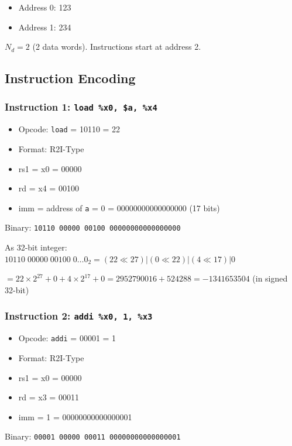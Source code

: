 \documentclass[12pt,a4paper]{article}
\begin{document}
\begin{itemize}
    \item Address 0: 123
    \item Address 1: 234
\end{itemize}

$N_d = 2$ (2 data words). Instructions start at address 2.

\subsection{Instruction Encoding}

\subsubsection{Instruction 1: \texttt{load \%x0, \$a, \%x4}}

\begin{itemize}
    \item Opcode: \texttt{load} = 10110 = 22
    \item Format: R2I-Type
    \item rs1 = x0 = 00000
    \item rd = x4 = 00100
    \item imm = address of \texttt{a} = 0 = 00000000000000000 (17 bits)
\end{itemize}

Binary: \texttt{10110 00000 00100 00000000000000000}

As 32-bit integer: $10110\;00000\;00100\;0\ldots0_2 = (22 \ll 27) | (0 \ll 22) | (4 \ll 17) | 0$

$= 22 \times 2^{27} + 0 + 4 \times 2^{17} + 0 = 2952790016 + 524288 = -1341653504$ (in signed 32-bit)

\subsubsection{Instruction 2: \texttt{addi \%x0, 1, \%x3}}

\begin{itemize}
    \item Opcode: \texttt{addi} = 00001 = 1
    \item Format: R2I-Type
    \item rs1 = x0 = 00000
    \item rd = x3 = 00011
    \item imm = 1 = 00000000000000001
\end{itemize}

Binary: \texttt{00001 00000 00011 00000000000000001}
\end{document}
